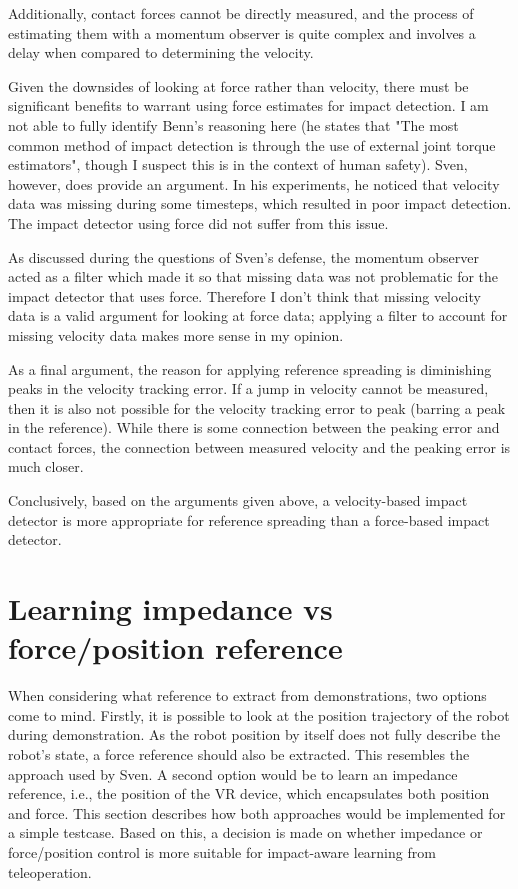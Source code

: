 \documentclass[11pt]{report}
\numberwithin{equation}{section}        %
\numberwithin{figure}{section}          %
\numberwithin{table}{section}           %
\begin{document}
  Additionally, contact forces cannot be directly measured, and the process of estimating them with a momentum observer is quite complex and involves a delay when compared to determining the velocity. 

  Given the downsides of looking at force rather than velocity, there must be significant benefits to warrant using force estimates for impact detection. I am not able to fully identify Benn's reasoning here (he states that "The most common method of impact detection is through the use of external joint torque estimators", though I suspect this is in the context of human safety). Sven, however, does provide an argument. In his experiments, he noticed that velocity data was missing during some timesteps, which resulted in poor impact detection. The impact detector using force did not suffer from this issue.

  As discussed during the questions of Sven's defense, the momentum observer acted as a filter which made it so that missing data was not problematic for the impact detector that uses force. Therefore I don't think that missing velocity data is a valid argument for looking at force data; applying a filter to account for missing velocity data makes more sense in my opinion.

  As a final argument, the reason for applying reference spreading is diminishing peaks in the velocity tracking error. If a jump in velocity cannot be measured, then it is also not possible for the velocity tracking error to peak (barring a peak in the reference). While there is some connection between the peaking error and contact forces, the connection between measured velocity and the peaking error is much closer.

  Conclusively, based on the arguments given above, a velocity-based impact detector is more appropriate for reference spreading than a force-based impact detector.
  
  \newpage

  \section{Learning impedance vs force/position reference}\label{sec:lfd}
  When considering what reference to extract from demonstrations, two options come to mind. Firstly, it is possible to look at the position trajectory of the robot during demonstration. As the robot position by itself does not fully describe the robot's state, a force reference should also be extracted. This resembles the approach used by Sven. A second option would be to learn an impedance reference, i.e., the position of the VR device, which encapsulates both position and force. This section describes how both approaches would be implemented for a simple testcase. Based on this, a decision is made on whether impedance or force/position control is more suitable for impact-aware learning from teleoperation.
\end{document}
